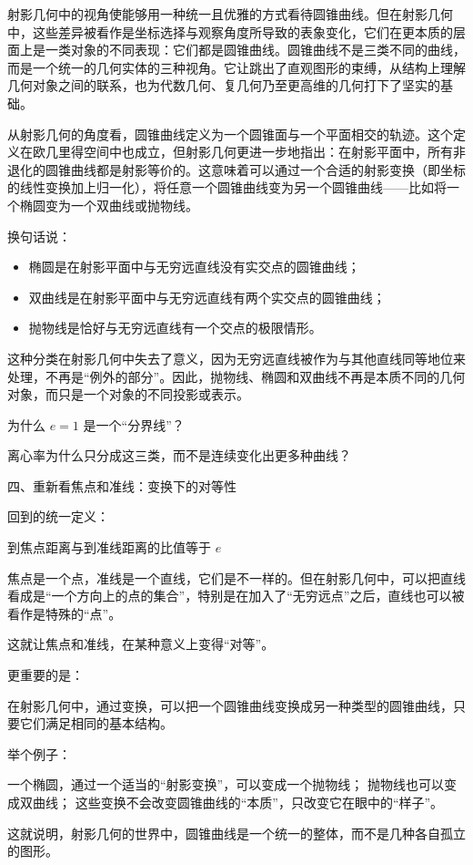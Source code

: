 射影几何中的视角使能够用一种统一且优雅的方式看待圆锥曲线。但在射影几何中，这些差异被看作是坐标选择与观察角度所导致的表象变化，它们在更本质的层面上是一类对象的不同表现：它们都是圆锥曲线。圆锥曲线不是三类不同的曲线，而是一个统一的几何实体的三种视角。它让跳出了直观图形的束缚，从结构上理解几何对象之间的联系，也为代数几何、复几何乃至更高维的几何打下了坚实的基础。

从射影几何的角度看，圆锥曲线定义为一个圆锥面与一个平面相交的轨迹。这个定义在欧几里得空间中也成立，但射影几何更进一步地指出：在射影平面中，所有非退化的圆锥曲线都是射影等价的。这意味着可以通过一个合适的射影变换（即坐标的线性变换加上归一化），将任意一个圆锥曲线变为另一个圆锥曲线——比如将一个椭圆变为一个双曲线或抛物线。

换句话说：
\begin{itemize}
\item 椭圆是在射影平面中与无穷远直线没有实交点的圆锥曲线；
\item 双曲线是在射影平面中与无穷远直线有两个实交点的圆锥曲线；
\item 抛物线是恰好与无穷远直线有一个交点的极限情形。
\end{itemize}

这种分类在射影几何中失去了意义，因为无穷远直线被作为与其他直线同等地位来处理，不再是“例外的部分”。因此，抛物线、椭圆和双曲线不再是本质不同的几何对象，而只是一个对象的不同投影或表示。


为什么 $e=1$ 是一个“分界线”？

离心率为什么只分成这三类，而不是连续变化出更多种曲线？

四、重新看焦点和准线：变换下的对等性

回到的统一定义：

到焦点距离与到准线距离的比值等于 $e$

焦点是一个点，准线是一个直线，它们是不一样的。但在射影几何中，可以把直线看成是“一个方向上的点的集合”，特别是在加入了“无穷远点”之后，直线也可以被看作是特殊的“点”。

这就让焦点和准线，在某种意义上变得“对等”。

更重要的是：

在射影几何中，通过变换，可以把一个圆锥曲线变换成另一种类型的圆锥曲线，只要它们满足相同的基本结构。

举个例子：


一个椭圆，通过一个适当的“射影变换”，可以变成一个抛物线；
抛物线也可以变成双曲线；
这些变换不会改变圆锥曲线的“本质”，只改变它在眼中的“样子”。

这就说明，射影几何的世界中，圆锥曲线是一个统一的整体，而不是几种各自孤立的图形。


